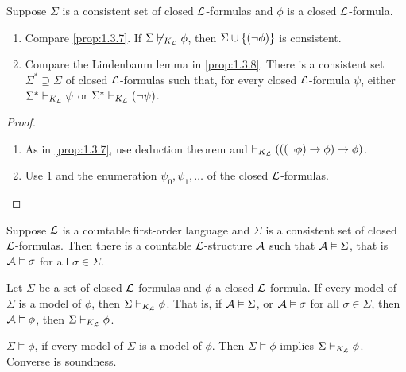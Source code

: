 \begin{proposition}
\label{prop:2.5.2}
Suppose $ \Sigma $ is a consistent set of closed $ \LL $-formulas and $ \phi $ is a closed $ \LL $-formula.
\begin{enumerate}
\item Compare \ref{prop:1.3.7}. If $ \Sigma \not\vdash_{K_\LL} \phi $, then $ \Sigma \cup \cb{\notb{\phi}} $ is consistent.
\item Compare the Lindenbaum lemma in \ref{prop:1.3.8}. There is a consistent set $ \Sigma^* \supseteq \Sigma $ of closed $ \LL $-formulas such that, for every closed $ \LL $-formula $ \psi $, either $ \Sigma^* \vdash_{K_\LL} \psi $ or $ \Sigma^* \vdash_{K_\LL} \notb{\psi} $.
\end{enumerate}
\end{proposition}

\begin{proof}
\hfill
\begin{enumerate}
\item As in \ref{prop:1.3.7}, use deduction theorem and $ \vdash_{K_\LL} \impb{\impb{\notb{\phi}}{\phi}}{\phi} $.
\item Use $ 1 $ and the enumeration $ \psi_0, \psi_1, \dots $ of the closed $ \LL $-formulas.
\end{enumerate}
\end{proof}

\pagebreak

\begin{theorem}
\label{thm:2.5.3}
Suppose $ \LL $ is a countable first-order language and $ \Sigma $ is a consistent set of closed $ \LL $-formulas. Then there is a countable $ \LL $-structure $ \AA $ such that $ \AA \vDash \Sigma $, that is $ \AA \vDash \sigma $ for all $ \sigma \in \Sigma $.
\end{theorem}

\begin{theorem}
\label{thm:2.5.4}
Let $ \Sigma $ be a set of closed $ \LL $-formulas and $ \phi $ a closed $ \LL $-formula. If every model of $ \Sigma $ is a model of $ \phi $, then $ \Sigma \vdash_{K_\LL} \phi $. That is, if $ \AA \vDash \Sigma $, or $ \AA \vDash \sigma $ for all $ \sigma \in \Sigma $, then $ \AA \vDash \phi $, then $ \Sigma \vdash_{K_\LL} \phi $.
\end{theorem}

\begin{notation*}
$ \Sigma \vDash \phi $, if every model of $ \Sigma $ is a model of $ \phi $. Then $ \Sigma \vDash \phi $ implies $ \Sigma \vdash_{K_\LL} \phi $. Converse is soundness.
\end{notation*}

